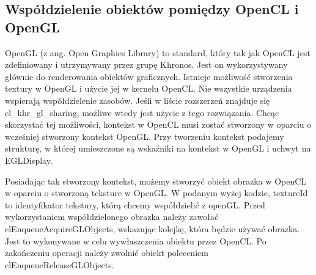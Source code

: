 \subsection [Współdzielenie obiektów pomiędzy OpenCL i OpenGL]{Współdzielenie obiektów pomiędzy OpenCL i OpenGL}
OpenGL (z ang. Open Graphics Library) to standard, który tak jak OpenCL jest zdefiniowany i utrzymywany przez grupę Khronos. Jest on wykorzystywany głównie do renderowania obiektów graficznych.
Istnieje możliwość stworzenia textury w OpenGL i użycie jej w kernelu OpenCL. Nie wszystkie urządzenia wspierają współdzielenie zasobów. Jeśli w liście rozszerzeń znajduje się cl\_khr\_gl\_sharing, możliwe wtedy jest użycie z tego rozwiązania. Chcąc skorzystać tej możliwości, kontekst w OpenCL musi zostać stworzony w oparciu o wcześniej stworzony kontekst OpenGL. Przy tworzeniu kontekst podajemy strukturę, w której umieszczone są wskaźniki na kontekst w OpenGL i uchwyt na EGLDisplay. 
 
 Posiadając tak stworzony kontekst, możemy stworzyć obiekt obrazka w OpenCL w oparciu o stworzoną teksture w OpenGL.
  W podanym wyżej kodzie, textureId to identyfikator tekstury, którą chcemy współdzielić z openGL. 
 Przed wykorzystaniem współdzielonego obrazka należy zawołać clEnqueueAcquireGLObjects, wskazując kolejkę, która będzie używać obrazka. Jest to wykonywane w celu wywłaszczenia obiektu przez OpenCL. Po zakończeniu operacji należy zwolnić obiekt poleceniem clEnqueueReleaseGLObjects.



